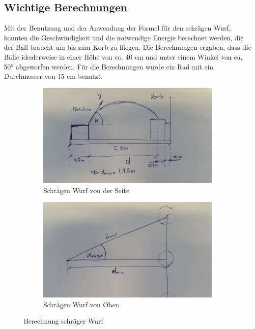 \subsection{Wichtige Berechnungen}\label{sec:berechnungen}
Mit der Benutzung und der Anwendung der Formel für den schrägen Wurf, konnten die Geschwindigkeit und die notwendige Energie berechnet werden, 
die der Ball braucht um bis zum Korb zu fliegen. Die Berechnungen ergaben, dass die Bälle idealerweise in einer Höhe von ca. 40 cm und unter einem Winkel von ca. 50° abgeworfen werden. Für die Berechnungen wurde ein Rad mit ein Durchmesser von 15 cm benutzt. \\

\begin{figure}[h!]
	\begin{subfigure}{.5\textwidth}
		\includegraphics[width=1\textwidth]{../../fig/Skizze_Berechnung_1.jpg}
		\caption{Schrägen Wurf von der Seite}
		\label{fig:Berechnungen von die Geschwindigkeit}
	\end{subfigure} %
	\begin{subfigure}{.5\textwidth}
		\includegraphics[width=1\textwidth]{../../fig/Skizze_Berechnung_2.jpg}
		\caption{Schrägen Wurf von Oben}
		\label{fig:Berechnungen von die Geschwindigkeit}
	\end{subfigure}
	\caption{Berechnung schräger Wurf}
	\label{Berechnungen}
\end{figure}

